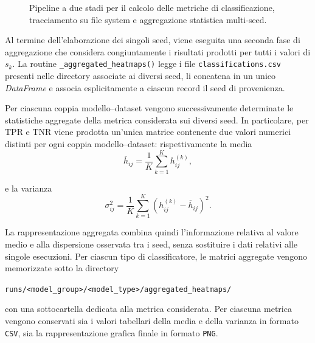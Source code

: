 \begin{figure}[H]
\caption{Pipeline a due stadi per il calcolo delle metriche di classificazione, tracciamento su file system e aggregazione statistica multi-seed.}
\label{fig:pipeline_metriche_aggregazione}
\end{figure}

Al termine dell'elaborazione dei singoli seed, viene eseguita una seconda fase di aggregazione che considera congiuntamente i risultati prodotti per tutti i valori di $s_k$. La routine \texttt{\_aggregated\_heatmaps()} legge i file \texttt{classifications.csv} presenti nelle directory associate ai diversi seed, li concatena in un unico \textit{DataFrame} e associa esplicitamente a ciascun record il seed di provenienza. 

Per ciascuna coppia modello--dataset vengono successivamente determinate le statistiche aggregate della metrica considerata sui diversi seed. In particolare, per TPR e TNR viene prodotta un'unica matrice contenente due valori numerici distinti per ogni coppia modello--dataset: rispettivamente la media
\begin{equation}
\overline{h}_{ij} = \frac{1}{K} \sum_{k=1}^{K} h_{ij}^{(k)},
\label{eq:metric_mean}
\end{equation}

e la varianza
\begin{equation}
\sigma_{ij}^{2} = \frac{1}{K} \sum_{k=1}^{K} \left( h_{ij}^{(k)}-\overline{h}_{ij} \right)^2.
\label{eq:metric_variance}
\end{equation}

La rappresentazione aggregata combina quindi l'informazione relativa al valore medio e alla dispersione osservata tra i seed, senza sostituire i dati relativi alle singole esecuzioni. 
Per ciascun tipo di classificatore, le matrici aggregate vengono memorizzate sotto la directory
\begin{center}
    \texttt{runs/<model\_group>/<model\_type>/aggregated\_heatmaps/}
\end{center}
con una sottocartella dedicata alla metrica considerata. Per ciascuna metrica vengono conservati sia i valori tabellari della media e della varianza in formato \texttt{CSV}, sia la rappresentazione grafica finale in formato \texttt{PNG}.

